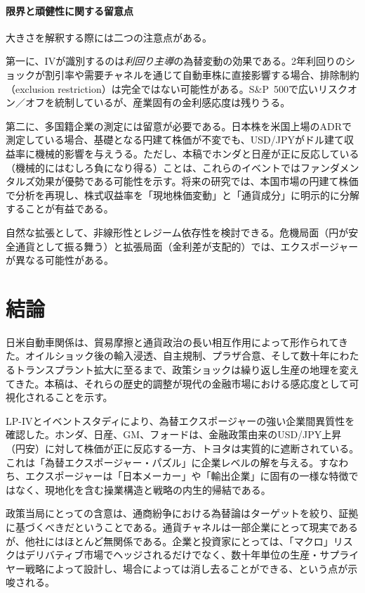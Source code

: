 \documentclass[12pt,a4paper]{article}
\begin{document}
\paragraph{限界と頑健性に関する留意点}

大きさを解釈する際には二つの注意点がある。

第一に、IVが識別するのは\emph{利回り主導}の為替変動の効果である。2年利回りのショックが割引率や需要チャネルを通じて自動車株に直接影響する場合、排除制約（exclusion restriction）は完全ではない可能性がある。S\&P~500で広いリスクオン／オフを統制しているが、産業固有の金利感応度は残りうる。

第二に、多国籍企業の測定には留意が必要である。日本株を米国上場のADRで測定している場合、基礎となる円建て株価が不変でも、USD/JPYがドル建て収益率に機械的影響を与えうる。ただし、本稿でホンダと日産が正に反応している（機械的にはむしろ負になり得る）ことは、これらのイベントではファンダメンタルズ効果が優勢である可能性を示す。将来の研究では、本国市場の円建て株価で分析を再現し、株式収益率を「現地株価変動」と「通貨成分」に明示的に分解することが有益である。

自然な拡張として、非線形性とレジーム依存性を検討できる。危機局面（円が安全通貨として振る舞う）と拡張局面（金利差が支配的）では、エクスポージャーが異なる可能性がある。

\section{結論}

日米自動車関係は、貿易摩擦と通貨政治の長い相互作用によって形作られてきた。オイルショック後の輸入浸透、自主規制、プラザ合意、そして数十年にわたるトランスプラント拡大に至るまで、政策ショックは繰り返し生産の地理を変えてきた。本稿は、それらの歴史的調整が現代の金融市場における感応度として可視化されることを示す。

LP-IVとイベントスタディにより、為替エクスポージャーの強い企業間異質性を確認した。ホンダ、日産、GM、フォードは、金融政策由来のUSD/JPY上昇（円安）に対して株価が正に反応する一方、トヨタは実質的に遮断されている。これは「為替エクスポージャー・パズル」に企業レベルの解を与える。すなわち、エクスポージャーは「日本メーカー」や「輸出企業」に固有の一様な特徴ではなく、現地化を含む操業構造と戦略の内生的帰結である。

政策当局にとっての含意は、通商紛争における為替論はターゲットを絞り、証拠に基づくべきだということである。通貨チャネルは一部企業にとって現実であるが、他社にはほとんど無関係である。企業と投資家にとっては、「マクロ」リスクはデリバティブ市場でヘッジされるだけでなく、数十年単位の生産・サプライヤー戦略によって設計し、場合によっては消し去ることができる、という点が示唆される。




\end{document}
